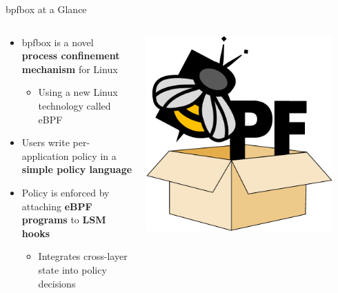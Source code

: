 \documentclass[12pt, dvipsnames, aspectratio=169]{beamer}
\begin{document}
\begin{frame}[c]{bpfbox at a Glance}
\begin{columns}
    \begin{column}{0.6\textwidth}
        \begin{itemize}
            \item bpfbox is a novel \textbf{process confinement mechanism} for Linux%
            \begin{itemize}
                \item Using a new Linux technology called eBPF
            \end{itemize}
            \vspace{2em}
            \item Users write per-application policy in a \textbf{simple policy language}
            \vspace{2em}
            \item Policy is enforced by attaching \textbf{eBPF programs} to \textbf{LSM hooks}%
            \begin{itemize}
                \item Integrates cross-layer state into policy decisions
            \end{itemize}
        \end{itemize}
    \end{column}
    \begin{column}{0.4\textwidth}
        \begin{center}
            \color{black}
            \includegraphics[width=0.9\textwidth]{figs/bpfbox-logo.pdf}\\
        \end{center}
        \vspace{1em}
    \end{column}
\end{columns}
\end{frame}
\end{document}
